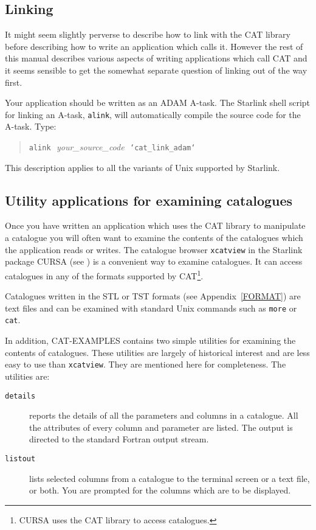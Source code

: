 \subsection{\label{LINK}Linking}

It might seem slightly perverse to describe how to link with the CAT 
library before describing how to write an application which calls it. 
However the rest of this manual describes various aspects of writing 
applications which call CAT and it seems sensible to get the somewhat 
separate question of linking out of the way first.

Your application should be written as an ADAM A-task.  The Starlink
shell script for linking an A-task, {\tt alink}, will automatically compile
the source code for the A-task. Type:

\begin{verse}
{\tt alink}\,\, {\it  your\_source\_code}\,\,  {\tt `cat\_link\_adam`}
\end{verse}

This description applies to all the variants of Unix supported by 
Starlink. 

\subsection{\label{UTIL}Utility applications for examining catalogues}

Once you have written an application which uses the CAT library to
manipulate a catalogue you will often want to examine the contents of
the catalogues which the application reads or writes.  The catalogue
browser {\tt xcatview} in the Starlink package CURSA (see
\cite{SUN190}) is a convenient way to examine
catalogues.  It can access catalogues in any of the formats supported
by CAT\footnote{CURSA uses the CAT library to access catalogues.}. 

Catalogues written in the STL or TST formats (see Appendix~\ref{FORMAT})
are text files and can be examined with standard Unix commands such
as {\tt more} or {\tt cat}.

In addition, CAT-EXAMPLES contains two simple utilities for examining the
contents of catalogues.  These utilities are largely of historical
interest and are less easy to use than {\tt xcatview}.  They are mentioned
here for completeness.  The utilities are:

\begin{description}

  \item[{\tt details}] reports the details of all the parameters and 
   columns in a catalogue. All the attributes of every column and 
   parameter are listed. The output is directed to the standard Fortran 
   output stream.

  \item[{\tt listout}] lists selected columns from a catalogue to the 
   terminal screen or a text file, or both. You are prompted for the 
   columns which are to be displayed.

\end{description}

